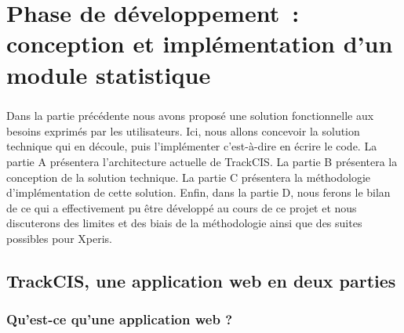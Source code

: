 \chapter{Phase de développement~: conception et implémentation d'un module
statistique}
	\paragraph{}
	Dans la partie précédente nous avons proposé une solution fonctionnelle aux
	besoins exprimés par les utilisateurs. Ici, nous allons concevoir la solution
	technique qui en découle, puis l'implémenter
	c'est-à-dire en écrire le code.
	La partie A présentera l'architecture actuelle de TrackCIS. La partie B
	présentera la conception de la solution technique. La partie C présentera
	la méthodologie d'implémentation de cette solution. Enfin, dans la partie D,
	nous ferons le bilan de ce qui a effectivement pu être développé au cours de
	ce projet et nous discuterons des limites et des biais de la méthodologie
	ainsi que des suites possibles pour Xperis.
	
	\section{TrackCIS, une application web en deux parties}
		
		\subsection{Qu'est-ce qu'une application web ?}
